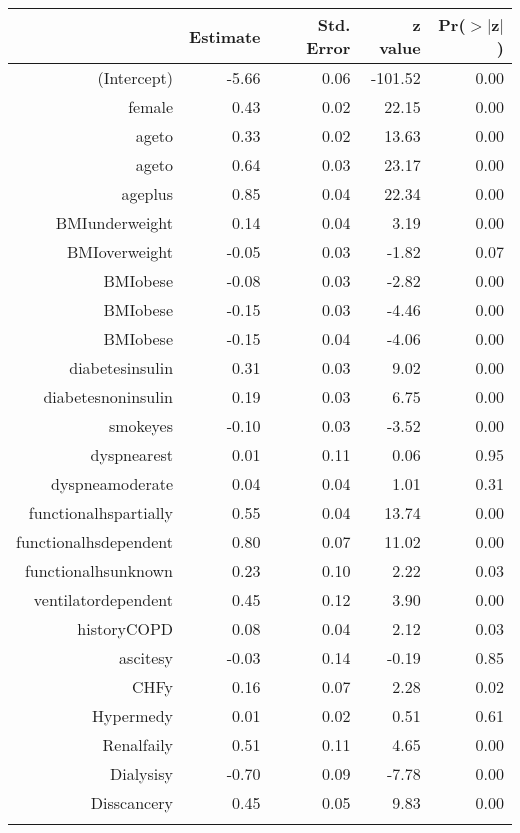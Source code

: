 \bigskip\bigskip
\centering
\begin{tabular}{rrrrr}
  \hline
 & Estimate & Std. Error & z value & Pr($>$$|$z$|$) \\ 
  \hline
(Intercept) & -5.66 & 0.06 & -101.52 & 0.00 \\ 
  female & 0.43 & 0.02 & 22.15 & 0.00 \\ 
  age\-65\-to\-74 & 0.33 & 0.02 & 13.63 & 0.00 \\ 
  age\-75\-to\-84 & 0.64 & 0.03 & 23.17 & 0.00 \\ 
  age\-85\-plus & 0.85 & 0.04 & 22.34 & 0.00 \\ 
  BMI\-underweight & 0.14 & 0.04 & 3.19 & 0.00 \\ 
  BMI\-overweight & -0.05 & 0.03 & -1.82 & 0.07 \\ 
  BMI\-obese\-1 & -0.08 & 0.03 & -2.82 & 0.00 \\ 
  BMI\-obese\-2 & -0.15 & 0.03 & -4.46 & 0.00 \\ 
  BMI\-obese\-3 & -0.15 & 0.04 & -4.06 & 0.00 \\ 
  diabetes\-insulin & 0.31 & 0.03 & 9.02 & 0.00 \\ 
  diabetes\-noninsulin & 0.19 & 0.03 & 6.75 & 0.00 \\ 
  smoke\-yes & -0.10 & 0.03 & -3.52 & 0.00 \\ 
  dyspnea\-rest & 0.01 & 0.11 & 0.06 & 0.95 \\ 
  dyspnea\-moderate & 0.04 & 0.04 & 1.01 & 0.31 \\ 
  functional\-hs\-partially & 0.55 & 0.04 & 13.74 & 0.00 \\ 
  functional\-hs\-dependent & 0.80 & 0.07 & 11.02 & 0.00 \\ 
  functional\-hs\-unknown & 0.23 & 0.10 & 2.22 & 0.03 \\ 
  ventilator\-dependent & 0.45 & 0.12 & 3.90 & 0.00 \\ 
  history\-COPD & 0.08 & 0.04 & 2.12 & 0.03 \\ 
  ascites\-y & -0.03 & 0.14 & -0.19 & 0.85 \\ 
  CHF\-y & 0.16 & 0.07 & 2.28 & 0.02 \\ 
  Hyper\-med\-y & 0.01 & 0.02 & 0.51 & 0.61 \\ 
  Renal\-fail\-y & 0.51 & 0.11 & 4.65 & 0.00 \\ 
  Dialysis\-y & -0.70 & 0.09 & -7.78 & 0.00 \\ 
  Diss\-cancer\-y & 0.45 & 0.05 & 9.83 & 0.00 \\ 
$$
\end{tabular}

